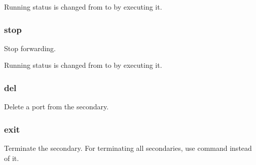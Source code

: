 \documentclass[a4paper,11pt,openany,oneside,english]{sphinxmanual}
\begin{document}
Running status is changed from  to  by
executing it.

\begin{sphinxVerbatim}[commandchars=\\\{\},formatcom=\footnotesize]
\end{sphinxVerbatim}


\subsubsection{stop}
\label{\detokenize{commands/secondary/spp_nfv:stop}}\label{\detokenize{commands/secondary/spp_nfv:commands-spp-nfv-stop}}
Stop forwarding.

\begin{sphinxVerbatim}[commandchars=\\\{\},formatcom=\footnotesize]
\end{sphinxVerbatim}

Running status is changed from  to  by
executing it.

\begin{sphinxVerbatim}[commandchars=\\\{\},formatcom=\footnotesize]
\end{sphinxVerbatim}


\subsubsection{del}
\label{\detokenize{commands/secondary/spp_nfv:del}}\label{\detokenize{commands/secondary/spp_nfv:commands-spp-nfv-del}}
Delete a port from the secondary.

\begin{sphinxVerbatim}[commandchars=\\\{\},formatcom=\footnotesize]
\end{sphinxVerbatim}


\subsubsection{exit}
\label{\detokenize{commands/secondary/spp_nfv:exit}}\label{\detokenize{commands/secondary/spp_nfv:commands-spp-nfv-exit}}
Terminate the secondary. For terminating all secondaries,
use  command instead of it.
\end{document}
